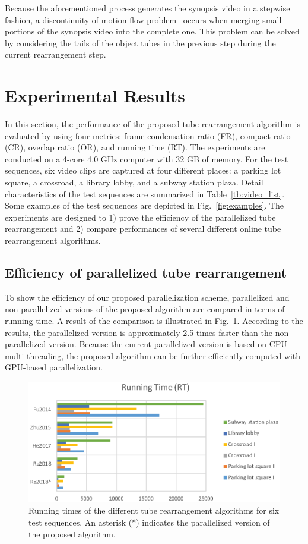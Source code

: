 \documentclass[11pt]{hyu_thesis}
\begin{document}
Because the aforementioned process generates the synopsis video in a stepwise fashion, a discontinuity of motion flow problem~\cite{Fu2014} occurs when merging small portions of the synopsis video into the complete one. This problem can be solved by considering the tails of the object tubes in the previous step during the current rearrangement step.

\section{Experimental Results}
\label{sec:exp}
In this section, the performance of the proposed tube rearrangement algorithm is evaluated by using four metrics: frame condensation ratio (FR), compact ratio (CR), overlap ratio (OR), and running time (RT). The experiments are conducted on a 4-core 4.0 GHz computer with 32 GB of memory. For the test sequences, six video clips are captured at four different places: a parking lot square, a crossroad, a library lobby, and a subway station plaza. Detail characteristics of the test sequences are summarized in Table~\ref{tb:video_list}. Some examples of the test sequences are depicted in Fig.~\ref{fig:examples}. The experiments are designed to 1) prove the efficiency of the parallelized tube rearrangement and 2) compare performances of several different online tube rearrangement algorithms.

\subsection{Efficiency of parallelized tube rearrangement}

To show the efficiency of our proposed parallelization scheme, parallelized and non-parallelized versions of the proposed algorithm are compared in terms of running time. A result of the comparison is illustrated in Fig.~\ref{fig:RT}. According to the results, the parallelized version is approximately 2.5 times faster than the non-parallelized version. Because the current parallelized version is based on CPU multi-threading, the proposed algorithm can be further efficiently computed with GPU-based parallelization.

\begin{figure}[t]
\begin{center}
\includegraphics[width=0.9\linewidth]{RT.eps}
\end{center}
   \caption{Running times of the different tube rearrangement algorithms for six test sequences. An asterisk (*) indicates the parallelized version of the proposed algorithm.}
\label{fig:RT}
\end{figure}
\end{document}

